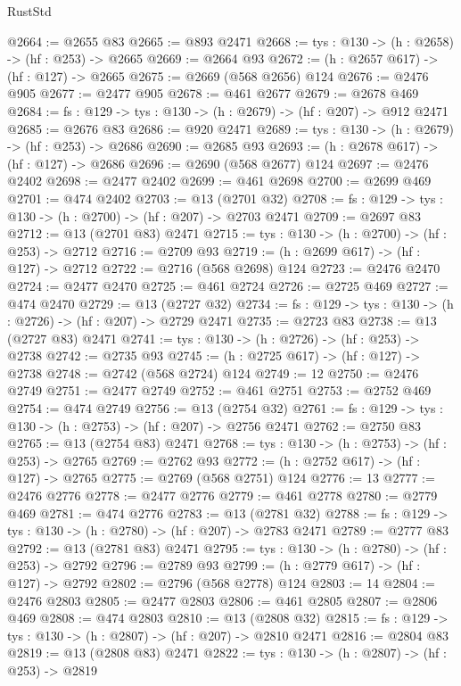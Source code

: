 \begin{lexlean}{RustStd}
\begin{coremodule}
{\begin{coremodule}
{{{{{{{{{{{{{{{@2664 := @2655 @83
@2665 := @893 @2471
@2668 := {tys : @130} -> (h : @2658) -> (hf : @253) -> @2665
@2669 := @2664 @93
@2672 := (h : @2657 @617) -> (hf : @127) -> @2665
@2675 := @2669 (@568 @2656) @124
@2676 := @2476 @905
@2677 := @2477 @905
@2678 := @461 @2677
@2679 := @2678 @469
@2684 := {fs : @129} -> {tys : @130} -> (h : @2679) -> (hf : @207) -> @912 @2471
@2685 := @2676 @83
@2686 := @920 @2471
@2689 := {tys : @130} -> (h : @2679) -> (hf : @253) -> @2686
@2690 := @2685 @93
@2693 := (h : @2678 @617) -> (hf : @127) -> @2686
@2696 := @2690 (@568 @2677) @124
@2697 := @2476 @2402
@2698 := @2477 @2402
@2699 := @461 @2698
@2700 := @2699 @469
@2701 := @474 @2402
@2703 := @13 (@2701 @32)
@2708 := {fs : @129} -> {tys : @130} -> (h : @2700) -> (hf : @207) -> @2703 @2471
@2709 := @2697 @83
@2712 := @13 (@2701 @83) @2471
@2715 := {tys : @130} -> (h : @2700) -> (hf : @253) -> @2712
@2716 := @2709 @93
@2719 := (h : @2699 @617) -> (hf : @127) -> @2712
@2722 := @2716 (@568 @2698) @124
@2723 := @2476 @2470
@2724 := @2477 @2470
@2725 := @461 @2724
@2726 := @2725 @469
@2727 := @474 @2470
@2729 := @13 (@2727 @32)
@2734 := {fs : @129} -> {tys : @130} -> (h : @2726) -> (hf : @207) -> @2729 @2471
@2735 := @2723 @83
@2738 := @13 (@2727 @83) @2471
@2741 := {tys : @130} -> (h : @2726) -> (hf : @253) -> @2738
@2742 := @2735 @93
@2745 := (h : @2725 @617) -> (hf : @127) -> @2738
@2748 := @2742 (@568 @2724) @124
@2749 := 12
@2750 := @2476 @2749
@2751 := @2477 @2749
@2752 := @461 @2751
@2753 := @2752 @469
@2754 := @474 @2749
@2756 := @13 (@2754 @32)
@2761 := {fs : @129} -> {tys : @130} -> (h : @2753) -> (hf : @207) -> @2756 @2471
@2762 := @2750 @83
@2765 := @13 (@2754 @83) @2471
@2768 := {tys : @130} -> (h : @2753) -> (hf : @253) -> @2765
@2769 := @2762 @93
@2772 := (h : @2752 @617) -> (hf : @127) -> @2765
@2775 := @2769 (@568 @2751) @124
@2776 := 13
@2777 := @2476 @2776
@2778 := @2477 @2776
@2779 := @461 @2778
@2780 := @2779 @469
@2781 := @474 @2776
@2783 := @13 (@2781 @32)
@2788 := {fs : @129} -> {tys : @130} -> (h : @2780) -> (hf : @207) -> @2783 @2471
@2789 := @2777 @83
@2792 := @13 (@2781 @83) @2471
@2795 := {tys : @130} -> (h : @2780) -> (hf : @253) -> @2792
@2796 := @2789 @93
@2799 := (h : @2779 @617) -> (hf : @127) -> @2792
@2802 := @2796 (@568 @2778) @124
@2803 := 14
@2804 := @2476 @2803
@2805 := @2477 @2803
@2806 := @461 @2805
@2807 := @2806 @469
@2808 := @474 @2803
@2810 := @13 (@2808 @32)
@2815 := {fs : @129} -> {tys : @130} -> (h : @2807) -> (hf : @207) -> @2810 @2471
@2816 := @2804 @83
@2819 := @13 (@2808 @83) @2471
@2822 := {tys : @130} -> (h : @2807) -> (hf : @253) -> @2819
}}}}}}}}}}}}}}}
\end{coremodule}}
\end{coremodule}
\end{lexlean}
